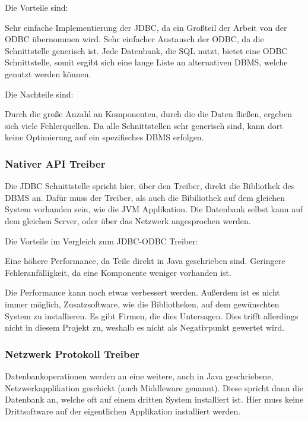 Die Vorteile sind:

\begin{outline}
  \1 Sehr einfache Implementierung der JDBC, da ein Großteil der Arbeit von
  der ODBC übernommen wird.
  \1 Sehr einfacher Austausch der ODBC, da die Schnittstelle generisch ist.
  \1 Jede Datenbank, die SQL nutzt, bietet eine ODBC Schnittstelle, somit
  ergibt sich eine lange Liste an alternativen DBMS, welche genutzt werden
  können.
\end{outline}

Die Nachteile sind:

\begin{outline}
  \1 Durch die große Anzahl an Komponenten, durch die die Daten fließen,
  ergeben sich viele Fehlerquellen.
  \1 Da alle Schnittstellen sehr generisch sind, kann dort keine Optimierung
  auf ein spezifisches DBMS erfolgen.
\end{outline}

\subsubsection{Nativer API Treiber}
Die JDBC Schnittstelle spricht hier, über den Treiber, direkt die Bibliothek
des DBMS an. Dafür muss der Treiber, als auch die Bibiliothek auf dem gleichen
System vorhanden sein, wie die JVM Applikation. Die Datenbank selbst kann auf
dem gleichen Server, oder über das Netzwerk angesprochen werden.

Die Vorteile im Vergleich zum JDBC-ODBC Treiber:
\begin{outline}
  \1 Eine höhere Performance, da Teile direkt in Java geschrieben sind.
  \1 Geringere Fehleranfälligkeit, da eine Komponente weniger vorhanden ist.
\end{outline}

Die Performance kann noch etwas verbessert werden. Außerdem ist es nicht immer
möglich, Zusatzsoftware, wie die Bibliotheken, auf dem gewünschten System zu
installieren. Es gibt Firmen, die dies Untersagen. Dies trifft allerdings nicht
in diesem Projekt zu, weshalb es nicht als Negativpunkt gewertet wird.

\subsubsection{Netzwerk Protokoll Treiber}
Datenbankoperationen werden an eine weitere, auch in Java geschriebene,
Netzwerkapplikation geschickt (auch Middleware genannt). Diese spricht dann die
Datenbank an, welche oft auf einem dritten System installiert ist. Hier muss
keine Drittsoftware auf der eigentlichen Applikation installiert werden.

